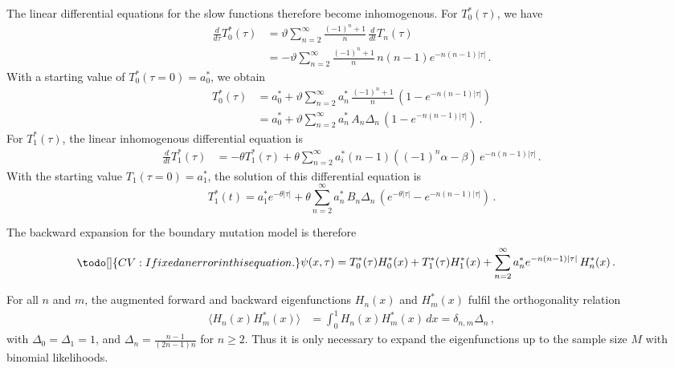 \documentclass[preprint]{elsarticle}
\begin{document}
The linear differential equations for the slow functions therefore become inhomogenous.
For $T_0^{*}(\tau)$, we have
\begin{equation}
\begin{split}
    \frac{d}{d\tau} T_0^{*}(\tau)&=\vartheta\sum_{n=2}^\infty \frac{(-1)^n+1}{n}\,\frac{d}{dt} T_n(\tau)\\
    &=-\vartheta\sum_{n=2}^\infty \frac{(-1)^n+1}{n}\,n(n-1)e^{-n(n-1) |\tau|}\,.
\end{split}
\end{equation}
With a starting value of $T_0^{*}(\tau=0)=a_0^{*}$, we obtain
\begin{equation}
\begin{split}
    T_0^{*}(\tau)&=a_0^{*}+\vartheta\sum_{n=2}^\infty a_n^{*}\,\frac{(-1)^n+1}{n}\, (1- e^{-n(n-1) |\tau|})\\
        &=a_0^{*}+\vartheta\sum_{n=2}^\infty a_n^{*}\,A_n\Delta_n\, (1- e^{-n(n-1) |\tau|})\,.
\end{split}
\end{equation}
For $T_1^{*}(\tau)$, the linear inhomogenous differential equation is 
\begin{equation}
\begin{split}
    \frac{d}{dt} T_1^{*}(\tau)&=-\theta T_1^{*} (\tau)
    +\theta\sum_{n=2}^\infty a_i^{*} (n-1)((-1)^n\alpha-\beta)\,e^{-n(n-1) |\tau|} \,.
\end{split}
\end{equation}
With the starting value $T_1(\tau=0)=a_1^{*}$, the solution of this differential equation is
\begin{equation}
    T_1^{*}(t)=a_1^{*} e^{-\theta |\tau|} 
    +\theta\sum_{n=2}^\infty a_n^{*}\,B_n\Delta_n\,  (e^{-\theta |\tau|}- e^{-n(n-1) |\tau|}) \,.
\end{equation}

The backward expansion for the boundary mutation model is therefore
\begin{equation}\label{eq:backw_expansion_boundary}
\todo[]{CV: I fixed an error in this equation.}
\begin{split}
    &\psi(x,\tau)=T_0^{*}(\tau)H_0^{*}(x)+ T_1^{*}(\tau)H_1^{*}(x)+\sum_{n=2}^\infty a_n^{*} e^{-n(n-1) |\tau|}\,H_n^{*}(x)\,.
\end{split}
\end{equation}

For all $n$ and $m$, the augmented forward and backward eigenfunctions $H_n(x)$ and $H_m^{*}(x)$ fulfil the orthogonality relation 
\begin{equation}
\begin{split}
    \langle H_n(x)H_m^{*}(x)\rangle&= \int_0^1 H_n(x)H_m^{*}(x)\,dx=\delta_{n,m}\Delta_n\,,
\end{split}
\end{equation}
with $\Delta_0=\Delta_1=1$, and $\Delta_n=\frac{n-1}{(2n-1)n}$ for $n\geq 2$. Thus it is only necessary to expand the eigenfunctions up to the sample size $M$ with binomial likelihoods. 
\end{document}
